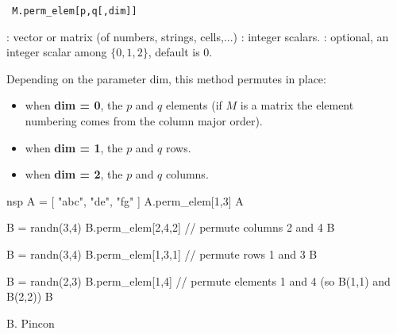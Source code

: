 
\begin{mandesc}
\end{mandesc}

\begin{calling_sequence}
\begin{verbatim}
 M.perm_elem[p,q[,dim]]
\end{verbatim}
\end{calling_sequence}

\begin{parameters}
  \begin{varlist}
   : vector or matrix (of numbers, strings, cells,...)
   : integer scalars.
   : optional, an integer scalar among $\{0,1,2\}$, default is 0.
  \end{varlist}
\end{parameters}

\begin{mandescription}
Depending on the parameter dim, this method permutes in place:  
\begin{itemize}
\item when {\bf dim = 0}, the $p$ and $q$ elements (if $M$ is a matrix
 the element numbering comes from the column  major order).
\item when {\bf dim = 1}, the $p$ and $q$ rows.
\item when {\bf dim = 2}, the $p$ and $q$ columns.
\end{itemize}

\end{mandescription}

\begin{examples}
\begin{mintednsp}{nsp}
A = [ "abc", "de",  "fg" ]
A.perm_elem[1,3]
A

B = randn(3,4)
B.perm_elem[2,4,2]  // permute columns 2 and 4
B

B = randn(3,4)
B.perm_elem[1,3,1]  // permute rows 1 and 3
B

B = randn(2,3)
B.perm_elem[1,4]  // permute elements 1 and 4 (so B(1,1) and B(2,2))
B
\end{mintednsp}
\end{examples}


\begin{manseealso}
\end{manseealso}

\begin{authors}
B. Pincon
\end{authors}

